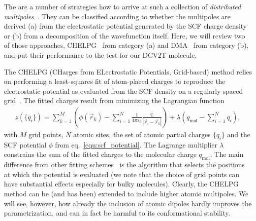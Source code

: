 The are a number of strategies how to arrive at such a collection of {\em distributed multipoles}~\cite{stone_theory_1997,verstraelen_assessment_2012,breneman_determining_1990,stone_distributed_1985,stone_distributed_2005}. They can be classified according to whether the multipoles are derived (a) from the electrostatic potential generated by the SCF charge density or (b) from a decomposition of the wavefunction itself. Here, we will review two of those approaches, CHELPG~\cite{breneman_determining_1990} from category (a) and DMA~\cite{stone_distributed_1985} from category (b), and put their performance to the test for our DCV2T molecule.

The CHELPG (CHarges from ELectrostatic Potentials, Grid-based) method relies on performing a least-squares fit of atom-placed charges to reproduce the electrostatic potential as evaluated from the SCF density on a regularly spaced grid~\cite{breneman_determining_1990}. The fitted charges result from minimizing the Lagrangian function~\cite{chirlian_atomic_1987}
\begin{align}
 z(\{q_i\}) = \sum_{k=1}^M \left( \phi(\vec{r}_k) - \sum_{i=1}^N \frac{1}{4\pi\varepsilon_0} \frac{q_i}{|\vec{r}_i-\vec{r}_k|} \right) + \lambda \left( q_\textrm{mol} - \sum_{i=1}^N q_i \right),
\end{align}
with $M$ grid points, $N$ atomic sites, the set of atomic partial charges $\{q_i\}$ and the SCF potential $\phi$ from eq.~\ref{equ:scf_potential}. The Lagrange multiplier $\lambda$ constrains the sum of the fitted charges to the molecular charge $q_\textrm{mol}$. The main difference from other fitting schemes~\cite{singh_approach_1984} is the algorithm that selects the positions at which the potential is evaluated (we note that the choice of grid points can have substantial effects especially for bulky molecules).
Clearly, the CHELPG method can be (and has been) extended to include higher atomic multipoles. We will see, however, how already the inclusion of atomic dipoles hardly improves the parametrization, and can in fact be harmful to its conformational stability.

